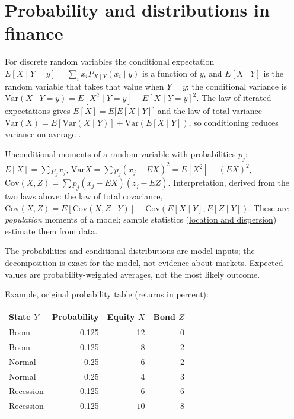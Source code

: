 \section{Probability and distributions in finance}

\begin{qfdefinition}\label{def:conditional-moments}
 For discrete random variables the conditional expectation $E[X\mid Y=y]=\sum_i x_iP_{X\mid Y}(x_i\mid y)$ is a function of $y$, and $E[X\mid Y]$ is the random variable that takes that value when $Y=y$; the conditional variance is $\mathrm{Var}(X\mid Y=y)=E[X^2\mid Y=y]-E[X\mid Y=y]^2$. The law of iterated expectations gives $E[X]=E\bigl[E[X\mid Y]\bigr]$ and the law of total variance $\mathrm{Var}(X)=E[\mathrm{Var}(X\mid Y)]+\mathrm{Var}(E[X\mid Y])$, so conditioning reduces variance on average \citep[sec.~5.1.5]{probability-statistics-random-processes}.

 Unconditional moments of a random variable with probabilities $p_j$: $E[X]=\sum p_jx_j$, $\mathrm{Var}X=\sum p_j(x_j-EX)^2=E[X^2]-(EX)^2$, $\mathrm{Cov}(X,Z)=\sum p_j(x_j-EX)(z_j-EZ)$. Interpretation, derived from the two laws above: the law of total covariance, $\mathrm{Cov}(X,Z)=E[\mathrm{Cov}(X,Z\mid Y)]+\mathrm{Cov}(E[X\mid Y],E[Z\mid Y])$. These are \emph{population} moments of a model; sample statistics (\hyperref[def:return-sample-statistics]{location and dispersion}) estimate them from data.

 The probabilities and conditional distributions are model inputs; the decomposition is exact for the model, not evidence about markets. Expected values are probability-weighted averages, not the most likely outcome.

 Example, original probability table (returns in percent):

\begin{center}\small
\begin{tabular}{@{}lrrr@{}}
\toprule
State $Y$ & Probability & Equity $X$ & Bond $Z$ \\
\midrule
Boom & 0.125 & 12 & 0 \\
Boom & 0.125 & 8 & 2 \\
Normal & 0.25 & 6 & 2 \\
Normal & 0.25 & 4 & 3 \\
Recession & 0.125 & $-6$ & 6 \\
Recession & 0.125 & $-10$ & 8 \\
\bottomrule
\end{tabular}
\end{center}


\end{qfdefinition}

